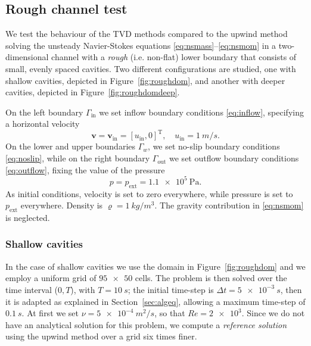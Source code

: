 \subsection{Rough channel test} \label{subsec:roughchannel}
We test the behaviour of the TVD methods compared to the upwind method solving 
the unsteady Navier-Stokes equations \eqref{eq:nsmass}--\eqref{eq:nsmom} in 
a two-dimensional channel with a \emph{rough} (i.e. non-flat) lower boundary that 
consists of small, evenly spaced cavities. Two different 
configurations are studied, one with shallow cavities, depicted in 
Figure~\ref{fig:roughdom}, and another with deeper cavities, depicted in 
Figure~\ref{fig:roughdomdeep}.

On the left boundary $\Gamma_\text{in}$ we set inflow boundary conditions 
\eqref{eq:inflow}, specifying a horizontal velocity
\begin{equation}
	\mathbf{v} = \mathbf{v}_\text{in} = [u_\text{in}, 0]^\mathrm{T}, \quad 
	u_\text{in} = \SI{1}{m/s}.
\end{equation}
On the lower and upper boundaries $\Gamma_w$, we set no-slip boundary 
conditions 
\eqref{eq:noslip}, while on the right boundary $\Gamma_\text{out}$ we set 
outflow boundary conditions \eqref{eq:outflow}, fixing the value of the pressure
\begin{equation}
	p = p_\text{ext} = \SI{1.1e5}{\pascal}.
\end{equation}
As initial conditions, velocity is set to zero everywhere, while pressure is 
set to $p_\text{ext}$ everywhere. Density is 
$\varrho=\SI{1}{kg/m^3}$. The gravity contribution in \eqref{eq:nsmom} is 
neglected.
%
\subsubsection{Shallow cavities}
In the case of shallow cavities we use the domain in Figure~\ref{fig:roughdom} 
and we employ a uniform grid of $\num{95x50}$ cells. The problem is then solved 
over the time interval ($0,T$), with $T=\SI{10}{s}$; the initial time-step is 
$\Delta t=\SI{5e-3}{s}$, then it is adapted as explained in 
Section~\ref{sec:algeq}, allowing a maximum time-step of $\SI{0.1}{s}$. 
At first we set $\nu=\SI{5e-4}{m^2/s}$, so that $Re=\num{2e3}$. Since we do not 
have an analytical solution for this problem, we compute a \emph{reference 
solution} using the upwind method over a grid six times finer.

